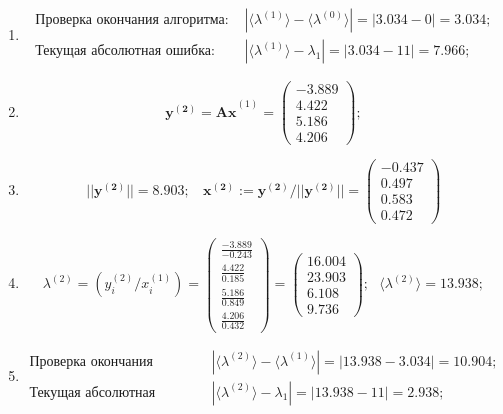 \begin{enumerate}
\item $$
    \begin{matrix}
        \text{Проверка окончания алгоритма: }&|\langle\lambda^{(1)}\rangle - \langle\lambda^{(0)}\rangle| = |3.034 - 0| = \mathbf{3.034};\\
        \text{Текущая абсолютная ошибка: }&|\langle\lambda^{(1)}\rangle - \lambda_1| = |3.034 - 11| = \mathbf{7.966};
    \end{matrix}$$



\item $$
    \mathbf{y^{(2)} =Ax}^{(1)} = \begin{pmatrix}-3.889\\4.422\\5.186\\4.206\end{pmatrix};$$

\item $$
    ||\mathbf{y^{(2)}}|| = 8.903; ~~~~
    \mathbf{x^{(2)}}:=\mathbf{y^{(2)}}/||\mathbf{y^{(2)}}|| =
    \begin{pmatrix}-0.437\\0.497\\0.583\\0.472\end{pmatrix}$$

\item $$
    \lambda^{(2)} =\left( y^{(2)}_i / x^{(1)}_i \right) =
    \begin{pmatrix} \frac{-3.889}{-0.243}\\\frac{4.422 }{0.185}\\\frac{5.186}{ 0.849}\\\frac{4.206}{ 0.432}\end{pmatrix}=
    \begin{pmatrix} 16.004\\23.903\\6.108\\9.736\end{pmatrix}; ~~~
    \langle\lambda^{(2)}\rangle = 13.938;$$

\item $$
    \begin{matrix}
        \text{Проверка окончания алгоритма: }&|\langle\lambda^{(2)}\rangle - \langle\lambda^{(1)}\rangle| = |13.938-3.034| =   \mathbf{10.904};\\
        \text{Текущая абсолютная ошибка: }&|\langle\lambda^{(2)}\rangle - \lambda_1| = |13.938 - 11| = \mathbf{2.938};
    \end{matrix}$$





\end{enumerate}
